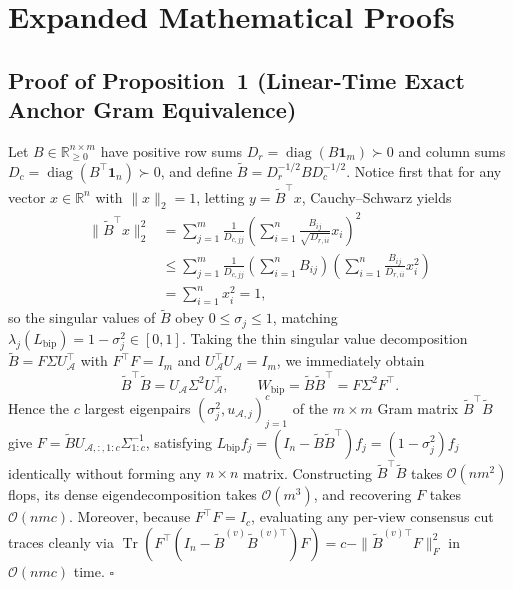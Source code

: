 \documentclass[journal]{IEEEtran}
\begin{document}


\section{Expanded Mathematical Proofs}\label{sec:s2}

\subsection{Proof of Proposition~1 (Linear-Time Exact Anchor Gram Equivalence)}
Let $B \in \mathbb{R}_{\ge 0}^{n \times m}$ have positive row sums $D_r = \operatorname{diag}(B\mathbf{1}_m) \succ 0$ and column sums $D_c = \operatorname{diag}(B^\top \mathbf{1}_n) \succ 0$, and define $\tilde{B} = D_r^{-1/2} B D_c^{-1/2}$. Notice first that for any vector $x \in \mathbb{R}^n$ with $\|x\|_2 = 1$, letting $y = \tilde{B}^\top x$, Cauchy--Schwarz yields
\begin{equation}
\begin{aligned}
\|\tilde{B}^\top x\|_2^2 &= \sum_{j=1}^m \frac{1}{D_{c,jj}}\left(\sum_{i=1}^n \frac{B_{ij}}{\sqrt{D_{r,ii}}} x_i\right)^2 \\
&\le \sum_{j=1}^m \frac{1}{D_{c,jj}}\left(\sum_{i=1}^n B_{ij}\right)\left(\sum_{i=1}^n \frac{B_{ij}}{D_{r,ii}} x_i^2\right) \\
&= \sum_{i=1}^n x_i^2 = 1,
\end{aligned}
\end{equation}
so the singular values of $\tilde{B}$ obey $0 \le \sigma_j \le 1$, matching $\lambda_j(L_{\mathrm{bip}}) = 1 - \sigma_j^2 \in [0, 1]$. Taking the thin singular value decomposition $\tilde{B} = F \Sigma U_{\mathcal{A}}^\top$ with $F^\top F = I_m$ and $U_{\mathcal{A}}^\top U_{\mathcal{A}} = I_m$, we immediately obtain
\begin{equation}
\tilde{B}^\top \tilde{B} = U_{\mathcal{A}} \Sigma^2 U_{\mathcal{A}}^\top, \qquad W_{\mathrm{bip}} = \tilde{B}\tilde{B}^\top = F \Sigma^2 F^\top.
\end{equation}
Hence the $c$ largest eigenpairs $(\sigma_j^2, u_{\mathcal{A},j})_{j=1}^c$ of the $m \times m$ Gram matrix $\tilde{B}^\top \tilde{B}$ give $F = \tilde{B} U_{\mathcal{A},:,1:c} \Sigma_{1:c}^{-1}$, satisfying $L_{\mathrm{bip}} f_j = (I_n - \tilde{B}\tilde{B}^\top) f_j = (1 - \sigma_j^2) f_j$ identically without forming any $n \times n$ matrix. Constructing $\tilde{B}^\top \tilde{B}$ takes $\mathcal{O}(nm^2)$ flops, its dense eigendecomposition takes $\mathcal{O}(m^3)$, and recovering $F$ takes $\mathcal{O}(nmc)$. Moreover, because $F^\top F = I_c$, evaluating any per-view consensus cut traces cleanly via $\operatorname{Tr}(F^\top (I_n - \tilde{B}^{(v)} \tilde{B}^{(v)\top}) F) = c - \|\tilde{B}^{(v)\top} F\|_F^2$ in $\mathcal{O}(nmc)$ time. $\square$
\end{document}
